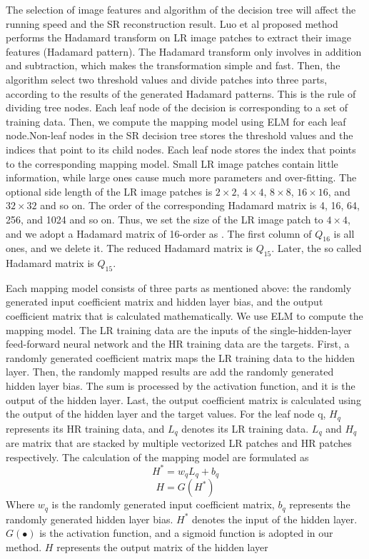 \documentclass[review,numbers,sort&compress]{elsarticle}  %
\begin{document}
The selection of image features and algorithm of the decision tree will affect the running speed and the SR reconstruction result. Luo et al \cite{LUO2018315} proposed method performs the Hadamard transform on LR image patches to extract their image features (Hadamard pattern). The Hadamard transform only involves in addition and subtraction, which makes the transformation simple and fast. Then, the algorithm select two threshold values and divide patches into three parts, according to the results of the generated Hadamard patterns. This is the rule of dividing tree nodes. Each leaf node of the decision is corresponding to a set of training data. Then, we compute the mapping model using ELM for each leaf node.Non-leaf nodes in the SR decision tree stores the threshold values and the indices that point to its child nodes. Each leaf node stores the index that points to the corresponding mapping model.
Small LR image patches contain little information, while large ones cause much more parameters and over-fitting. The optional side length of the LR image patches is $2\times2$, $4\times4$, $8\times8$, $16\times16$, and $32\times32$ and so on. The order of the corresponding Hadamard matrix is 4, 16, 64, 256, and 1024 and so on. Thus, we set the size of the LR image patch to $4×4$, and we adopt a Hadamard matrix of 16-order as \cite{LUO2018315}. The first column of $Q_{16}$ is all ones, and we delete it. The reduced Hadamard matrix is $Q_{15}$. Later, the so called Hadamard matrix is $Q_{15}$.

Each mapping model consists of three parts as mentioned above: the randomly generated input coefficient matrix and hidden layer bias, and the output coefficient matrix that is calculated mathematically. We use ELM to compute the mapping model. The LR training data are the inputs of the single-hidden-layer feed-forward neural network and the HR training data are the targets. First, a randomly generated coefficient matrix maps the LR training data to the hidden layer. Then, the randomly mapped results are add the randomly generated hidden layer bias. The sum is processed by the activation function, and it is the output of the hidden layer. Last, the output coefficient matrix is calculated using the output of the hidden layer and the target values.
For the leaf node q, $H_q$ represents its HR training data, and $L_q$ denotes its LR training data. $L_q$ and $H_q$ are matrix that are stacked by multiple vectorized LR patches and HR patches respectively. The calculation of the mapping model are formulated as
\begin{equation}\label{eq:map_model_1}
  H^*=w_q L_q+b_q
\end{equation}
\begin{equation}\label{eq:map_model_2}
  H=G(H^*)
\end{equation}
Where $w_q$ is the randomly generated input coefficient matrix, $b_q$ represents the randomly generated hidden layer bias. $H^*$ denotes the input of the hidden layer. $G(\bullet)$ is the activation function, and a sigmoid function is adopted in our method. $H$ represents the output matrix of the hidden layer
\end{document}
